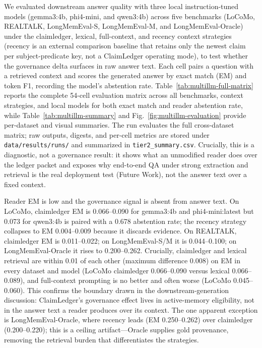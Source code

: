 We evaluated downstream answer quality with three local instruction-tuned models (gemma3:4b, phi4-mini, and qwen3:4b) across five benchmarks (LoCoMo, REALTALK, LongMemEval-S, LongMemEval-M, and Long\-Mem\-Eval-Oracle) under the claimledger, lexical, full-context, and recency context strategies (recency is an external comparison baseline that retains only the newest claim per subject-predicate key, not a ClaimLedger operating mode), to test whether the governance delta surfaces in raw answer text. Each cell pairs a question with a retrieved context and scores the generated answer by exact match (EM) and token F1, recording the model's abstention rate. Table~\ref{tab:multillm-full-matrix} reports the complete 54-cell evaluation matrix across all benchmarks, context strategies, and local models for both exact match and reader abstention rate, while Table~\ref{tab:multillm-summary} and Fig.~\ref{fig:multillm-evaluation} provide per-dataset and visual summaries. The run evaluates the full cross-dataset matrix; raw outputs, digests, and per-cell metrics are stored under \nolinkurl{data/results/runs/} and summarized in \nolinkurl{tier2_summary.csv}. Crucially, this is a diagnostic, not a governance result: it shows what an unmodified reader does over the ledger packet and exposes why end-to-end QA under strong extraction and retrieval is the real deployment test (Future Work), not the answer text over a fixed context.

Reader EM is low and the governance signal is absent from answer text. On LoCoMo, claimledger EM is 0.066--0.090 for gemma3:4b and phi4-mini:latest but 0.073 for qwen3:4b is paired with a 0.678 abstention rate; the recency strategy collapses to EM 0.004--0.009 because it discards evidence. On REALTALK, claimledger EM is 0.011--0.022; on LongMemEval-S/M it is 0.044--0.100; on LongMemEval-Oracle it rises to 0.200--0.262. Crucially, claimledger and lexical retrieval are within 0.01 of each other (maximum difference 0.008) on EM in every dataset and model (LoCoMo claimledger 0.066--0.090 versus lexical 0.066--0.089), and full-context prompting is no better and often worse (LoCoMo 0.045--0.060). This confirms the boundary drawn in the downstream-generation discussion: ClaimLedger's governance effect lives in active-memory eligibility, not in the answer text a reader produces over its context. The one apparent exception is LongMemEval-Oracle, where recency leads (EM 0.250--0.262) over claimledger (0.200--0.220); this is a ceiling artifact---Oracle supplies gold provenance, removing the retrieval burden that differentiates the strategies.

